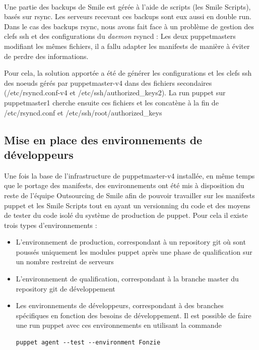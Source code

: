 \documentclass[14 pt,a4paper]{extreport}
\begin{document}
\paragraph*{}Une partie des backups de Smile est gérée à l'aide de scripts (les Smile Scripts), basés sur rsync. Les serveurs recevant ces backups sont eux aussi en double run. Dans le cas des backups rsync, nous avons fait face à un problème de gestion des clefs ssh et des configurations du \emph{daemon} rsyncd : Les deux puppetmasters modifiant les mêmes fichiers, il a fallu adapter les manifests de manière à éviter de perdre des informations.

Pour cela, la solution apportée a été de générer les configurations et les clefs ssh des noeuds gérés par puppetmaster-v4 dans des fichiers secondaires (/etc/rsyncd.conf-v4 et /etc/ssh/authorized\_keys2). La run puppet sur puppetmaster1 cherche ensuite ces fichiers et les concatène à la fin de /etc/rsyncd.conf et /etc/ssh/root/authorized\_keys

\subsection{Mise en place des environnements de développeurs}

Une fois la base de l'infrastructure de puppetmaster-v4 installée, en même temps que le portage des manifests, des environnements ont été mis à disposition du reste de l'équipe Outsourcing de Smile afin de pouvoir travailler sur les manifests puppet et les Smile Scripts tout en ayant un versionning du code et des moyens de tester du code isolé du système de production de puppet. Pour cela il existe trois types d'environnements :
\begin{itemize}
	\item L'environnement de production, correspondant à un repository git où sont poussés uniquement les modules puppet après une phase de qualification sur un nombre restreint de serveurs
	\item L'environnement de qualification, correspondant à la branche master du repository git de développement
	\item Les environnements de développeurs, correspondant à des branches spécifiques en fonction des besoins de développement. Il est possible de faire une run puppet avec ces environnements en utilisant la commande \begin{verbatim}puppet agent --test --environment Fonzie\end{verbatim}
\end{itemize}
\end{document}
